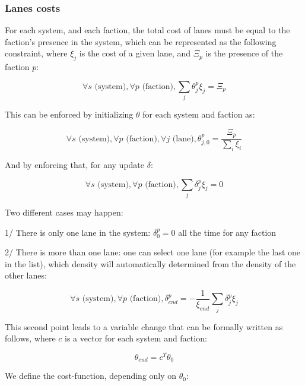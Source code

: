 \documentclass[11pt,a4paper]{article}		%
\begin{document}
\subsubsection{Lanes costs}

For each system, and each faction, the total cost of lanes must be equal to the faction's presence in the system, which can be represented as the following constraint, where $\xi_j$ is the cost of a given lane, and $\Xi_p$ is the presence of the faction $p$:

\begin{equation}
\forall s \text{ (system)}, \forall p \text{ (faction)}, \sum_j \theta_j^p \xi_j = \Xi_p
\end{equation}

This can be enforced by initializing $\theta$ for each system and faction as:

\begin{equation}
\forall s \text{ (system)}, \forall p \text{ (faction)}, \forall j \text{ (lane)}, \theta_{j,0}^p = \dfrac{\Xi_p}{\sum_i \xi_i}
\end{equation}

And by enforcing that, for any update $\delta$:

\begin{equation}
\forall s \text{ (system)}, \forall p \text{ (faction)}, \sum_j \delta_j^p \xi_j = 0
\end{equation}

Two different cases may happen:

1/ There is only one lane in the system: $\delta_0^p = 0$ all the time for any faction

2/ There is more than one lane: one can select one lane (for example the last one in the list), which density will automatically determined from the density of the other lanes:

\begin{equation}
\forall s \text{ (system)}, \forall p \text{ (faction)}, \delta_{end}^p = - \dfrac{1}{\xi_{end}} \sum_j \delta_j^p \xi_j
\end{equation}

This second point leads to a variable change that can be formally written as follows, where $c$ is a vector for each system and faction:

\begin{equation}
\theta_{end} = c^T \theta_0
\end{equation}

We define the cost-function, depending only on $\theta_0$:
\end{document}
